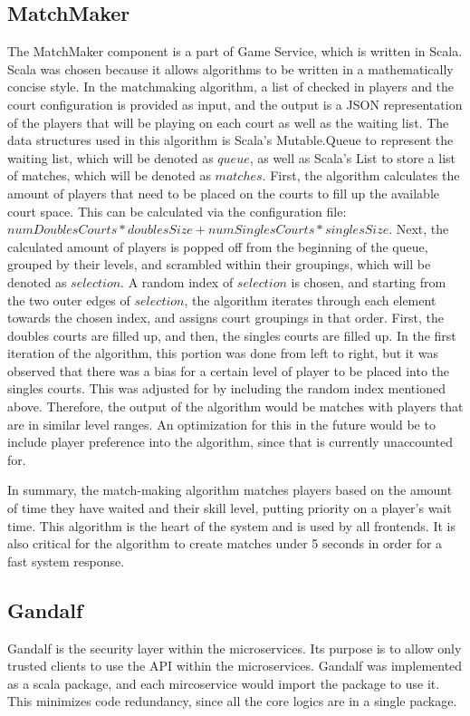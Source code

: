 \documentclass{article}
\begin{document}
\subsection{MatchMaker}
The MatchMaker component is a part of Game Service, which is written in Scala. Scala was chosen because it allows algorithms to be written in a mathematically concise style. In the matchmaking algorithm, a list of checked in players and the court configuration is provided as input, and the output is a JSON representation of the players that will be playing on each court as well as the waiting list. The data structures used in this algorithm is Scala's Mutable.Queue to represent the waiting list, which will be denoted as $queue$, as well as Scala's List to store a list of matches, which will be denoted as $matches$. First, the algorithm calculates the amount of players that need to be placed on the courts to fill up the available court space. This can be calculated via the configuration file: $numDoublesCourts * doublesSize + numSinglesCourts * singlesSize$. Next, the calculated amount of players is popped off from the beginning of the queue, grouped by their levels, and scrambled within their groupings, which will be denoted as $selection$. A random index of $selection$ is chosen, and starting from the two outer edges of $selection$, the algorithm iterates through each element towards the chosen index, and assigns court groupings in that order. First, the doubles courts are filled up, and then, the singles courts are filled up. In the first iteration of the algorithm, this portion was done from left to right, but it was observed that there was a bias for a certain level of player to be placed into the singles courts. This was adjusted for by including the random index mentioned above. Therefore, the output of the algorithm would be matches with players that are in similar level ranges. An optimization for this in the future would be to include player preference into the algorithm, since that is currently unaccounted for.

In summary, the match-making algorithm matches players based on the amount of time they have waited and their skill level, putting priority on a player's wait time. This algorithm is the heart of the system and is used by all frontends. It is also critical for the algorithm to create matches under 5 seconds in order for a fast system response.

\subsection{Gandalf}
Gandalf is the security layer within the microservices. Its purpose is to allow only trusted clients to use the API within the microservices. Gandalf was implemented as a scala package, and each mircoservice would import the package to use it. This minimizes code redundancy, since all the core logics are in a single package.
\end{document}
